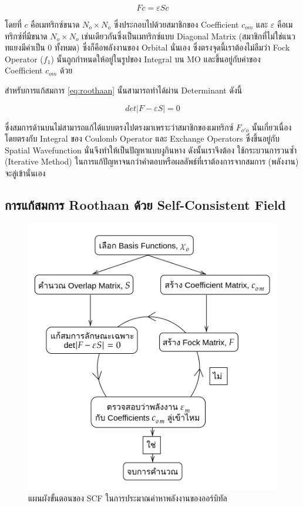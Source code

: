 \begin{equation}\label{eq:roothaan}
    F c = \varepsilon S c
\end{equation}

\noindent โดยที่ $c$ คือเมทริกซ์ขนาด $N_{o} \times N_{o}$ ซึ่งประกอบไปด้วยสมาชิกของ Coefficient $c_{om}$ และ $\varepsilon$ 
คือเมทริกซ์ที่มีขนาด $N_{o} \times N_{o}$ เช่นเดียวกันซึ่งเป็นเมทริกซ์แบบ Diagonal Matrix (สมาชิกที่ไม่ใช่แนวทแยงมีค่าเป็น 0 ทั้งหมด) 
ซึ่งก็คือพลังงานของ Orbital นั่นเอง ซึ่งตรงจุดนี้เราต้องไม่ลืมว่า Fock Operator ($f_{1}$) นั้นถูกกำหนดให้อยู่ในรูปของ Integral บน MO 
และขึ้นอยู่กับค่าของ Coefficient $c_{om}$ ด้วย

สำหรับการแก้สมการ \ref{eq:roothaan} นั้นสามารถทำได้ผ่าน Determinant ดังนี้

\begin{equation}\label{eq:scf_secular}
    det|F - \varepsilon S| = 0
\end{equation}

\noindent ซึ่งสมการด้านบนไม่สามารถแก้ได้แบบตรงไปตรงมาเพราะว่าสมาชิกของเมทริกซ์ $F_{o'o}$ นั้นเกี่ยวเนื่องโดยตรงกับ Integral ของ 
Coulomb Operator และ Exchange Operators ซึ่งขึ้นอยู่กับ Spatial Wavefunction นั่นจึงทำให้เป็นปัญหาแบบงูกินหาง ดังนั้นเราจึงต้อง%
ใช้กระบวนการวนซ้ำ (Iterative Method) ในการแก้ปัญหาจนกว่าคำตอบหรือผลลัพธ์ที่เราต้องการจากสมการ (พลังงาน) จะลู่เข้านั่นเอง

\subsection{การแก้สมการ Roothaan ด้วย Self-Consistent Field}
\label{ssec:roothaan_scf}

\begin{figure}[htbp]
    \centering
    \includegraphics[width=0.8\linewidth]{fig/scf.png}
    \caption{แผนผังขั้นตอนของ SCF ในการประมาณค่าหาพลังงานของออร์บิทัล}
    \label{fig:scf}
\end{figure}

